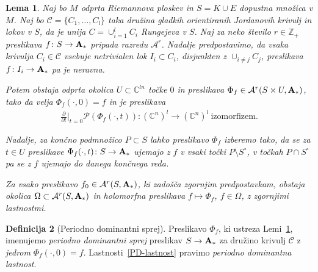 \documentclass[12pt,a4paper,twoside]{article}
\theoremstyle{definition} %
\newtheorem{definicija}{Definicija}[section]
\theoremstyle{plain} %
\newtheorem{lema}[definicija]{Lema}
\numberwithin{equation}{section}  %
\newcommand{\Z}{\mathbb Z}
\newcommand{\C}{\mathbb C}
\begin{document}
\begin{lema} \label{lema:P-D-sprej}
Naj bo $M$ odprta Riemannova ploskev in $S = K \cup E$ dopustna množica v $M$. Naj bo $\mathcal{C} = \{C_1, \dots , C_{l} \}$ taka družina gladkih orientiranih Jordanovih krivulj in lokov v $S$, da je unija $C = \cup_{i=1}^{l} C_{i}$ Rungejeva v $S$.
Naj za neko število $r \in \Z_{+}$ preslikava $f \colon S \to \textbf{\textup{A}}_{*}$ pripada razredu $\mathcal{A}^{r}$.
Nadalje predpostavimo, da vsaka krivulja $C_{i} \in \mathcal{C}$ vsebuje netrivialen lok $I_{i} \subset C_{i}$, disjunkten z $\cup_{i \neq j}C_{j}$, preslikava $f \colon I_{i} \to \textbf{\textup{A}}_{*}$ pa je neravna.

Potem obstaja odprta okolica $U \subset \C^{ln}$ točke $0$ in preslikava $\Phi_{f} \in \mathcal{A}^{r} (S \times U, \textbf{\textup{A}}_{*})$, tako da velja
$\Phi_{f}(\cdot, 0) = f$ in je preslikava
\begin{gather} \label{PD-lastnost}
	 \frac{\partial}{\partial t} \Big|_{t=0} \mathcal{P}(\Phi_{f}(\cdot, t)) \colon (\C^{n})^{l} \to (\C^{n})^{l} \ \text{izomorfizem.}
\end{gather}

Nadalje, za končno podmnožico $P \subset S$ lahko preslikavo $\Phi_{f}$ izberemo tako, da se za $t \in U$ preslikave $\Phi_{f}(\cdot, t) \colon S \to\textbf{\textup{A}}_{*}$ ujemajo z $f$ v vsaki točki $P \setminus S^\circ$, v točkah $P \cap S^\circ$ pa se z $f$ ujemajo do danega končnega reda.

Za vsako preslikavo $f_{0} \in \mathcal{A}^{r}(S, \textbf{\textup{A}}_{*})$, ki zadošča zgornjim predpostavkam, obstaja okolica $\Omega \subset \mathcal{A}^{r}(S, \textbf{\textup{A}}_{*})$ in holomorfna preslikava $f \mapsto \Phi_{f}$, $f \in \Omega$, z zgornjimi lastnostmi.
\end{lema}

\begin{definicija} [Periodno dominantni sprej]
Preslikavo $\Phi_{f}$, ki ustreza Lemi~\ref{lema:P-D-sprej}, imenujemo \emph{periodno dominantni sprej} preslikav $S \to \textbf{\textup{A}}_{*}$ za družino krivulj $\mathcal{C}$ z \emph{jedrom} $\Phi_{f}(\cdot, 0) = f$. Lastnosti~\eqref{PD-lastnost} pravimo \emph{periodno dominantna lastnost}.
\end{definicija}
\end{document}
